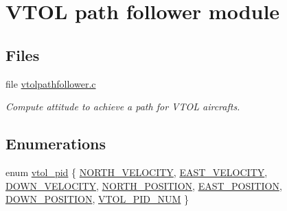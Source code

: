 \hypertarget{group___vtol_path_follower}{\section{\-V\-T\-O\-L path follower module}
\label{group___vtol_path_follower}
}
\subsection*{\-Files}
\begin{DoxyCompactItemize}
\item 
file \hyperlink{vtolpathfollower_8c}{vtolpathfollower.\-c}
\begin{DoxyCompactList}\small\item\em \-Compute attitude to achieve a path for \-V\-T\-O\-L aircrafts. \end{DoxyCompactList}\end{DoxyCompactItemize}
\subsection*{\-Enumerations}
\begin{DoxyCompactItemize}
\item 
enum \hyperlink{group___vtol_path_follower_gaa1cc793c473ad52ad906c7feecdb3a37}{vtol\-\_\-pid} \{ \*
\hyperlink{group___vtol_path_follower_ggaa1cc793c473ad52ad906c7feecdb3a37ae45cff8467cdb386a31197540e5bdd56}{\-N\-O\-R\-T\-H\-\_\-\-V\-E\-L\-O\-C\-I\-T\-Y}, 
\hyperlink{group___vtol_path_follower_ggaa1cc793c473ad52ad906c7feecdb3a37aedb9ece820ccb3967caa3a880963724e}{\-E\-A\-S\-T\-\_\-\-V\-E\-L\-O\-C\-I\-T\-Y}, 
\hyperlink{group___vtol_path_follower_ggaa1cc793c473ad52ad906c7feecdb3a37ac40aaeb4635693d0cf03af8e9372708d}{\-D\-O\-W\-N\-\_\-\-V\-E\-L\-O\-C\-I\-T\-Y}, 
\hyperlink{group___vtol_path_follower_ggaa1cc793c473ad52ad906c7feecdb3a37a3f46558976ca7c653cc8c08475bcab2a}{\-N\-O\-R\-T\-H\-\_\-\-P\-O\-S\-I\-T\-I\-O\-N}, 
\*
\hyperlink{group___vtol_path_follower_ggaa1cc793c473ad52ad906c7feecdb3a37a16d8665516d2ff93c39520ff3a7aaa10}{\-E\-A\-S\-T\-\_\-\-P\-O\-S\-I\-T\-I\-O\-N}, 
\hyperlink{group___vtol_path_follower_ggaa1cc793c473ad52ad906c7feecdb3a37a545c2f2e31b041e3c0dec80772eacc04}{\-D\-O\-W\-N\-\_\-\-P\-O\-S\-I\-T\-I\-O\-N}, 
\hyperlink{group___vtol_path_follower_ggaa1cc793c473ad52ad906c7feecdb3a37ac92fcbf75f1c93775999e6788aa2342d}{\-V\-T\-O\-L\-\_\-\-P\-I\-D\-\_\-\-N\-U\-M}
 \}
\end{DoxyCompactItemize}
